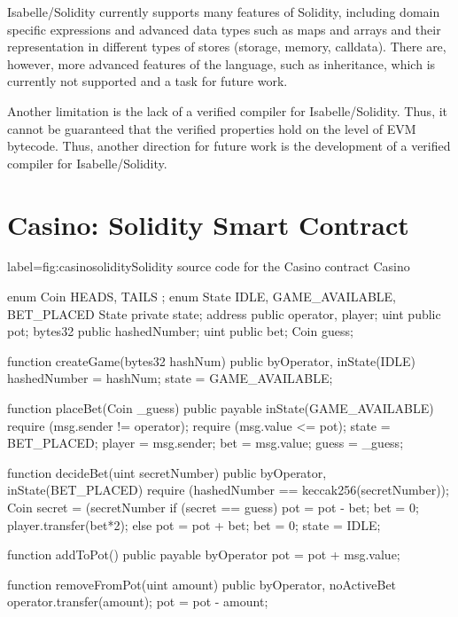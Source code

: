 \documentclass[a4paper,UKenglish,cleveref, autoref, thm-restate]{oasics-v2021}
\begin{document}
Isabelle/Solidity currently supports many features of Solidity, including domain specific expressions and advanced data types such as maps and arrays and their representation in different types of stores (storage, memory, calldata).
There are, however, more advanced features of the language, such as inheritance, which is currently not supported and a task for future work.

Another limitation is the lack of a verified compiler for Isabelle/Solidity.
Thus, it cannot be guaranteed that the verified properties hold on the level of EVM bytecode.
Thus, another direction for future work is the development of a verified compiler for Isabelle/Solidity.
%
\newpage


\appendix

\section{Casino: Solidity Smart Contract}\label{sec:app1}


\begin{code}{label={fig:casino}}{solidity}{Solidity source code for the Casino}
	contract Casino {
		enum Coin { HEADS, TAILS } ;
		enum State { IDLE, GAME_AVAILABLE,  BET_PLACED }
		State private state; 
		address public operator, player;
		uint public pot;
		bytes32 public hashedNumber;
		uint public bet;
		Coin guess;

		function createGame(bytes32 hashNum) 
			public byOperator, inState(IDLE) { 
			hashedNumber = hashNum; 
			state = GAME_AVAILABLE;
		}

		function placeBet(Coin _guess) public payable inState(GAME_AVAILABLE) {
			require (msg.sender != operator);
			require (msg.value <= pot);
			state = BET_PLACED; 
			player = msg.sender; 
			bet = msg.value; 
			guess = _guess; 
		}

 		function decideBet(uint secretNumber) 
		public byOperator, inState(BET_PLACED) { 
			require (hashedNumber == keccak256(secretNumber)); 
			Coin secret = (secretNumber %
			if (secret == guess) {
				pot = pot - bet;  
				bet = 0;
        player.transfer(bet*2);
      }	else {
				pot = pot + bet; 
				bet = 0;
			}
			state = IDLE;
    }
		
    function addToPot() public payable byOperator {
      pot = pot + msg.value;
    }

		function removeFromPot(uint amount) public byOperator, noActiveBet { 
			operator.transfer(amount);  
			pot = pot - amount;
    }
	}
\end{code}
\end{document}

